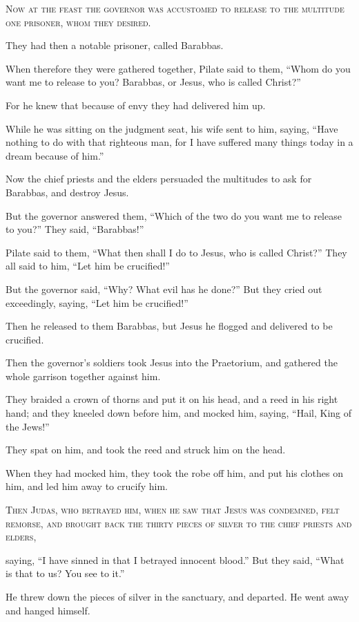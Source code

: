 \lettrine{N}{ow at the feast the governor was accustomed to release to the multitude one prisoner, whom they desired.}

They had then a notable prisoner, called Barabbas.

When therefore they were gathered together, Pilate said to them, “Whom do you want me to release to you? Barabbas, or Jesus, who is called Christ?”

For he knew that because of envy they had delivered him up.

While he was sitting on the judgment seat, his wife sent to him, saying, “Have nothing to do with that righteous man, for I have suffered many things today in a dream because of him.”

Now the chief priests and the elders persuaded the multitudes to ask for Barabbas, and destroy Jesus.

But the governor answered them, “Which of the two do you want me to release to you?” They said, “Barabbas!”

Pilate said to them, “What then shall I do to Jesus, who is called Christ?” They all said to him, “Let him be crucified!”

But the governor said, “Why? What evil has he done?” But they cried out exceedingly, saying, “Let him be crucified!”

Then he released to them Barabbas, but Jesus he flogged and delivered to be crucified.

Then the governor’s soldiers took Jesus into the Praetorium, and gathered the whole garrison together against him.

They braided a crown of thorns and put it on his head, and a reed in his right hand; and they kneeled down before him, and mocked him, saying, “Hail, King of the Jews!”

They spat on him, and took the reed and struck him on the head.

When they had mocked him, they took the robe off him, and put his clothes on him, and led him away to crucify him.

\lettrine{T}{hen Judas, who betrayed him, when he saw that Jesus was condemned, felt remorse, and brought back the thirty pieces of silver to the chief priests and elders,}

saying, “I have sinned in that I betrayed innocent blood.” But they said, “What is that to us? You see to it.”

He threw down the pieces of silver in the sanctuary, and departed. He went away and hanged himself.

